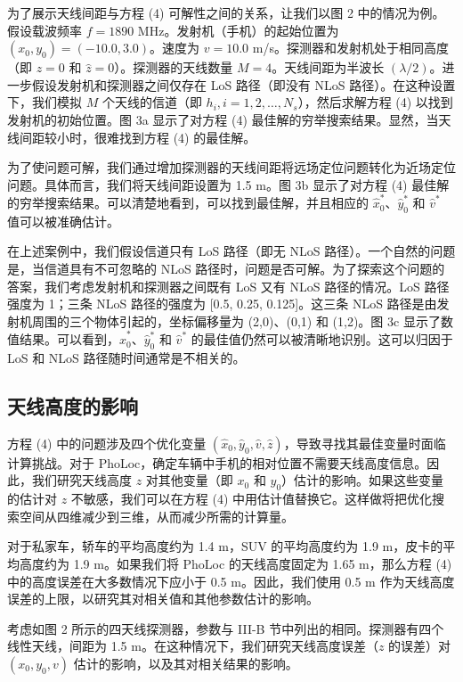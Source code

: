 \documentclass[journal, onecolumn]{IEEEtran}
\begin{document}
为了展示天线间距与方程 (4) 可解性之间的关系，让我们以图 2 中的情况为例。假设载波频率 $f=1890$ MHz。发射机（手机）的起始位置为 $(x_{0},y_{0})=(-10.0,3.0)$。速度为 $v=10.0$ m/s。探测器和发射机处于相同高度（即 $z=0$ 和 $\hat{z}=0$）。探测器的天线数量 $M=4$。天线间距为半波长 $(\lambda/2)$。进一步假设发射机和探测器之间仅存在 LoS 路径（即没有 NLoS 路径）。在这种设置下，我们模拟 $M$ 个天线的信道（即 $h_{i}, i=1,2,\dots,N_{s}$），然后求解方程 (4) 以找到发射机的初始位置。图 3a 显示了对方程 (4) 最佳解的穷举搜索结果。显然，当天线间距较小时，很难找到方程 (4) 的最佳解。

为了使问题可解，我们通过增加探测器的天线间距将远场定位问题转化为近场定位问题。具体而言，我们将天线间距设置为 1.5 m。图 3b 显示了对方程 (4) 最佳解的穷举搜索结果。可以清楚地看到，可以找到最佳解，并且相应的 $\hat{x}_{0}^{*}$、$\hat{y}_{0}^{*}$ 和 $\hat{v}^{*}$ 值可以被准确估计。

在上述案例中，我们假设信道只有 LoS 路径（即无 NLoS 路径）。一个自然的问题是，当信道具有不可忽略的 NLoS 路径时，问题是否可解。为了探索这个问题的答案，我们考虑发射机和探测器之间既有 LoS 又有 NLoS 路径的情况。LoS 路径强度为 1；三条 NLoS 路径的强度为 [0.5, 0.25, 0.125]。这三条 NLoS 路径是由发射机周围的三个物体引起的，坐标偏移量为 (2,0)、(0,1) 和 (1,2)。图 3c 显示了数值结果。可以看到，$\hat{x}_{0}^{*}$、$\hat{y}_{0}^{*}$ 和 $\hat{v}^{*}$ 的最佳值仍然可以被清晰地识别。这可以归因于 LoS 和 NLoS 路径随时间通常是不相关的。

\subsection{天线高度的影响}
方程 (4) 中的问题涉及四个优化变量 $(\hat{x}_{0}, \hat{y}_{0}, \hat{v}, \hat{z})$，导致寻找其最佳变量时面临计算挑战。对于 PhoLoc，确定车辆中手机的相对位置不需要天线高度信息。因此，我们研究天线高度 $z$ 对其他变量（即 $x_{0}$ 和 $y_{0}$）估计的影响。如果这些变量的估计对 $z$ 不敏感，我们可以在方程 (4) 中用估计值替换它。这样做将把优化搜索空间从四维减少到三维，从而减少所需的计算量。

对于私家车，轿车的平均高度约为 1.4 m，SUV 的平均高度约为 1.9 m，皮卡的平均高度约为 1.9 m。如果我们将 PhoLoc 的天线高度固定为 1.65 m，那么方程 (4) 中的高度误差在大多数情况下应小于 0.5 m。因此，我们使用 0.5 m 作为天线高度误差的上限，以研究其对相关值和其他参数估计的影响。

考虑如图 2 所示的四天线探测器，参数与 III-B 节中列出的相同。探测器有四个线性天线，间距为 1.5 m。在这种情况下，我们研究天线高度误差（$z$ 的误差）对 $(x_{0},y_{0},v)$ 估计的影响，以及其对相关结果的影响。
\end{document}
